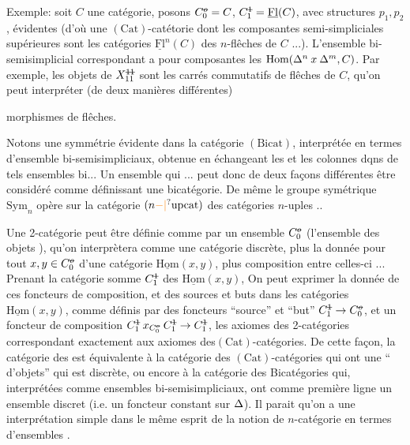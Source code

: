Exemple: soit $C$ une catégorie, posons $C^{\deleted{o}}_{\handwritten{0}}=C$, $C^{\deleted{1}}_{\handwritten{1}}=\underline{\mathrm{Fl}}(C)$, avec structures $p_1,p_2$, évidentes (d'où une $(\mathrm{Cat})$-catétorie dont les composantes semi-simpliciales supérieures sont les catégories $\underline{\mathrm{Fl}}^n(C)$ des $n$-flêches de $C$ ...). L'ensemble bi-semisimplicial correspondant a pour composantes les  $\mathrm{Hom}(\Delta^n\mathbin{x}\Delta^m,C)$. Par exemple, les objets de $X^{\deleted{11}}_{\handwritten{11}}$ sont les carrés commutatifs de flêches de $C$, qu'on peut interpréter (de deux manières différentes) 


morphismes de flêches.

Notons une symmétrie évidente dans la catégorie $(\mathrm{Bicat})$, interprétée en termes d'ensemble bi-semisimpliciaux, obtenue en échangeant les  et les colonnes dqns  de tels ensembles bi... Un ensemble  qui ... peut donc de deux façons différentes être considéré comme définissant une bicatégorie. De même le groupe symétrique $\mathrm{Sym}_n$ opère sur la catégorie  $(n\unsure{-|{}}\mathrm{upcat})$ des catégories $n$-uples ..

Une 2-catégorie peut être définie comme  par un ensemble  $C^{\deleted{o}}_{\handwritten{0}}$ (l'ensemble des objets ), qu'on interprètera comme une catégorie discrète, plus la donnée pour tout $x,y\handwritten{\in}C^{\deleted{o}}_{\handwritten{0}}$ d'une catégorie $\underline{\mathrm{Hom}}(x,y)$, plus   composition entre celles-ci ... Prenant la catégorie somme  $C^{\deleted{1}}_{\handwritten{1}}$ des $\underline{\mathrm{Hom}}(x,y)$, On peut exprimer la donnée de ces foncteurs de composition, et des sources et buts  dans les catégories $\underline{\mathrm{Hom}}(x,y)$, comme définis par des foncteurs ``source'' et ``but'' $C^{\deleted{1}}_{\handwritten{1}}\handwritten{\to}C^{\deleted{o}}_{\handwritten{0}}$, et un foncteur de composition $C^{\deleted{1}}_{\handwritten{1}}\mathbin{x}_{C^{\deleted{o}}_{\handwritten{0}}}C^{\deleted{1}}_{\handwritten{1}}\handwritten{\to}C^{\deleted{1}}_{\handwritten{1}}$, les axiomes des 2-catégories correspondant exactement aux axiomes des$(\mathrm{Cat})$-catégories. De cette façon, la catégorie des  est équivalente à la catégorie des $(\mathrm{Cat})$-catégories qui ont une `` d'objets'' qui est discrète, ou encore à la catégorie des Bicatégories qui, interprétées comme ensembles bi-semisimpliciaux, ont  comme première ligne un ensemble  discret (i.e. un foncteur constant sur $\Delta$). Il parait qu'on a une interprétation simple dans le même esprit de la notion de $n$-catégorie en termes d'ensembles .


